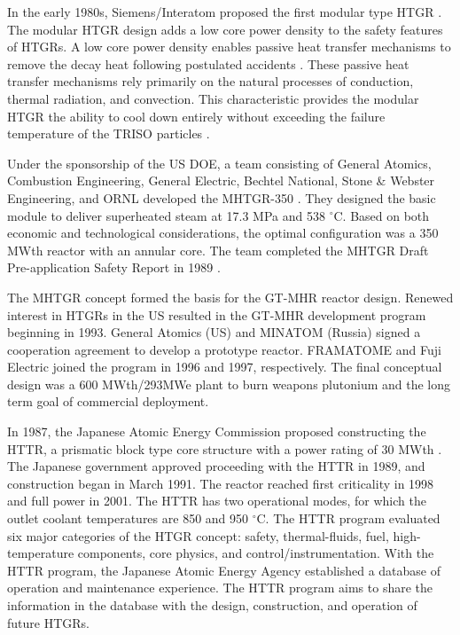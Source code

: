 In the early 1980s, Siemens/Interatom proposed the first modular type HTGR \cite{brey_development_2001}.
The modular HTGR design adds a low core power density to the safety features of HTGRs.
A low core power density enables passive heat transfer mechanisms to remove the decay heat following postulated accidents \cite{neylan_modular_1988}.
These passive heat transfer mechanisms rely primarily on the natural processes of conduction, thermal radiation, and convection.
This characteristic provides the modular HTGR the ability to cool down entirely without exceeding the failure temperature of the TRISO particles \cite{brey_development_2001}.

Under the sponsorship of the \gls{US} \gls{DOE}, a team consisting of General Atomics, Combustion Engineering, General Electric, Bechtel National, Stone \& Webster Engineering, and \gls{ORNL} developed the \gls{MHTGR}-350 \cite{neylan_modular_1988} \cite{silady_licensing_1988}.
They designed the basic module to deliver superheated steam at 17.3 MPa and 538 $^{\circ}$C.
Based on both economic and technological considerations, the optimal configuration was a 350 MWth reactor with an annular core.
The team completed the MHTGR Draft Pre-application Safety Report in 1989 \cite{huning_steady_2014} \cite{williams_draft_1989}.

The MHTGR concept formed the basis for the \gls{GT-MHR} reactor design.
Renewed interest in HTGRs in the US resulted in the GT-MHR development program beginning in 1993.
General Atomics (US) and MINATOM (Russia) signed a cooperation agreement to develop a prototype reactor.
FRAMATOME and Fuji Electric joined the program in 1996 and 1997, respectively.
The final conceptual design was a 600 MWth/293MWe plant to burn weapons plutonium and the long term goal of commercial deployment.

In 1987, the Japanese Atomic Energy Commission proposed constructing the \gls{HTTR}, a prismatic block type core structure with a power rating of 30 MWth \cite{iaea_current_2001}.
The Japanese government approved proceeding with the HTTR in 1989, and construction began in March 1991.
The reactor reached first criticality in 1998 and full power in 2001.
The HTTR has two operational modes, for which the outlet coolant temperatures are 850 and 950 $^{\circ}$C.
The HTTR program evaluated six major categories of the HTGR concept: safety, thermal-fluids, fuel, high-temperature components, core physics, and control/instrumentation.
With the HTTR program, the Japanese Atomic Energy Agency established a database of operation and maintenance experience.
The HTTR program aims to share the information in the database with the design, construction, and operation of future HTGRs.


